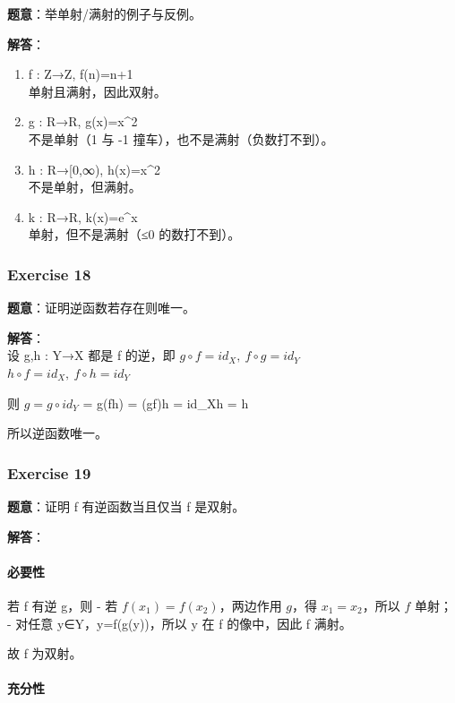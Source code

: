 \documentclass[
  11pt,
]{article}
\begin{document}
\textbf{题意}：举单射/满射的例子与反例。

\textbf{解答}：

\begin{enumerate}
\def\labelenumi{\arabic{enumi}.}
\item
  f : Z→Z, f(n)=n+1\\
  单射且满射，因此双射。
\item
  g : R→R, g(x)=x\^{}2\\
  不是单射（1 与 -1 撞车），也不是满射（负数打不到）。
\item
  h : R→{[}0,∞), h(x)=x\^{}2\\
  不是单射，但满射。
\item
  k : R→R, k(x)=e\^{}x\\
  单射，但不是满射（≤0 的数打不到）。
\end{enumerate}

\subsubsection{Exercise 18}\label{exercise-18}

\textbf{题意}：证明逆函数若存在则唯一。

\textbf{解答}：\\
设 g,h : Y→X 都是 f 的逆，即 \(g\circ f = id_X,\ f\circ g = id_Y\)\\
\(h\circ f = id_X,\ f\circ h = id_Y\)

则 \(g = g\circ id_Y\) = g\circ (f\circ h) = (g\circ f)\circ h =
id\_X\circ h = h

所以逆函数唯一。

\subsubsection{Exercise 19}\label{exercise-19}

\textbf{题意}：证明 f 有逆函数当且仅当 f 是双射。

\textbf{解答}：

\paragraph{必要性}\label{ux5fc5ux8981ux6027}

若 f 有逆 g，则 - 若 \(f(x_1)=f(x_2)\)，两边作用 \(g\)，得
\(x_1=x_2\)，所以 \(f\) 单射； - 对任意 y∈Y，y=f(g(y))，所以 y 在 f
的像中，因此 f 满射。

故 f 为双射。

\paragraph{充分性}\label{ux5145ux5206ux6027}
\end{document}
